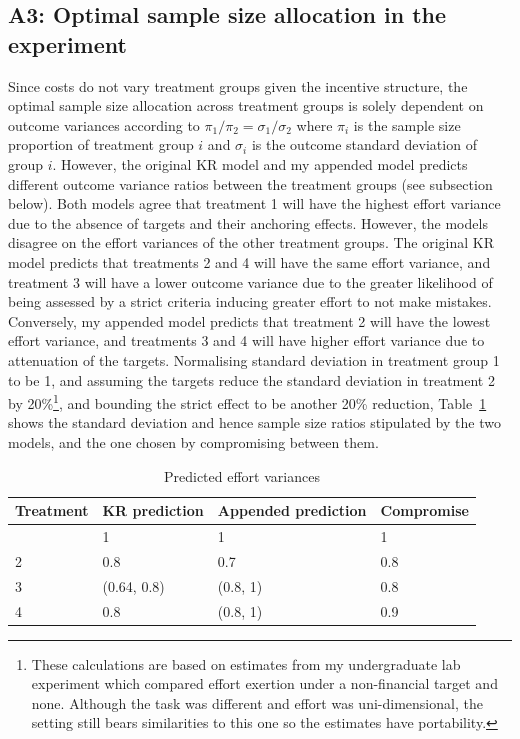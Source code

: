 \documentclass[12pt, letterpaper, DIV=11, numbers=noendperiod]{article}
\begin{document}
\subsection{A3: Optimal sample size allocation in the experiment}\label{a3-optimal-sample-size-allocation-in-the-experiment}

Since costs do not vary treatment groups given the incentive structure, the optimal sample size allocation across treatment groups is solely dependent on outcome variances according to \(\pi_1/\pi_2 = \sigma_1/\sigma_2\) where \(\pi_i\) is the sample size proportion of treatment group \(i\) and \(\sigma_i\) is the outcome standard deviation of group \(i\). However, the original KR model and my appended model predicts different outcome variance ratios between the treatment groups (see subsection below). Both models agree that treatment 1 will have the highest effort variance due to the absence of targets and their anchoring effects. However, the models disagree on the effort variances of the other treatment groups. The original KR model predicts that treatments 2 and 4 will have the same effort variance, and treatment 3 will have a lower outcome variance due to the greater likelihood of being assessed by a strict criteria inducing greater effort to not make mistakes. Conversely, my appended model predicts that treatment 2 will have the lowest effort variance, and treatments 3 and 4 will have higher effort variance due to attenuation of the targets. Normalising standard deviation in treatment group 1 to be 1, and assuming the targets reduce the standard deviation in treatment 2 by 20\%\footnote{These calculations are based on estimates from my undergraduate lab experiment which compared effort exertion under a non-financial target and none. Although the task was different and effort was uni-dimensional, the setting still bears similarities to this one so the estimates have portability.}, and bounding the strict effect to be another 20\% reduction, Table~\ref{tbl-predicted-variance} shows the standard deviation and hence sample size ratios stipulated by the two models, and the one chosen by compromising between them.

\begin{longtable}[]{@{}llll@{}}
\toprule
Treatment & KR prediction & Appended prediction & Compromise \\
\midrule
\endhead
\bottomrule
\caption{Predicted effort variances}\label{tbl-predicted-variance}
\endlastfoot
1 & 1 & 1 & 1 \\
2 & 0.8 & 0.7 & 0.8 \\
3 & (0.64, 0.8) & (0.8, 1) & 0.8 \\
4 & 0.8 & (0.8, 1) & 0.9 \\
\end{longtable}
\end{document}

